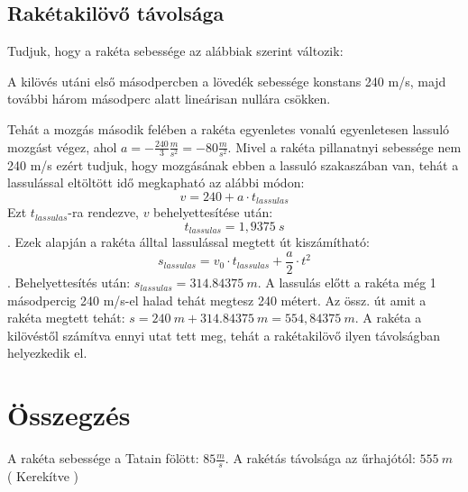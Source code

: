 \documentclass{article}[12pt,a4paper]
\begin{document}
\subsection{Rakétakilövő távolsága}
Tudjuk, hogy a rakéta sebessége az alábbiak szerint változik: \begin{displayquote}A kilövés utáni első másodpercben a lövedék sebessége konstans 240 m/s, majd további három másodperc alatt lineárisan nullára csökken.\end{displayquote}
Tehát a mozgás második felében a rakéta egyenletes vonalú egyenletesen lassuló mozgást végez, ahol $a = -\frac{240}{3} \frac{m}{s^2} = -80 \frac{m}{s^2}$. Mivel a rakéta pillanatnyi sebessége nem 240 m/s ezért tudjuk, hogy mozgásának ebben a lassuló szakaszában van, tehát a lassulással eltöltött idő megkapható az alábbi módon: $$v = 240 + a \cdot t_{lassulas}$$ Ezt $t_{lassulas}$-ra rendezve, $v$ behelyettesítése után: $$t_{lassulas} = 1,9375\ s$$.
Ezek alapján a rakéta álltal lassulással megtett út kiszámítható: $$s_{lassulas} = v_0\cdot t_{lassulas} + \frac{a}{2} \cdot t^2$$. Behelyettesítés után: $s_{lassulas} = 314.84375\ m$. A lassulás előtt a rakéta még 1 másodpercig 240 m/s-el halad tehát megtesz 240 métert. Az össz. út amit a rakéta megtett tehát: $s = 240\ m + 314.84375\ m = 554,84375\ m$. A rakéta a kilövéstől számítva ennyi utat tett meg, tehát a rakétakilövő ilyen távolságban helyezkedik el.

\section{Összegzés}

A rakéta sebessége a Tatain fölött: $85 \frac{m}{s}$.
A rakétás távolsága az űrhajótól: $555\ m$ ( Kerekítve )
\end{document}
